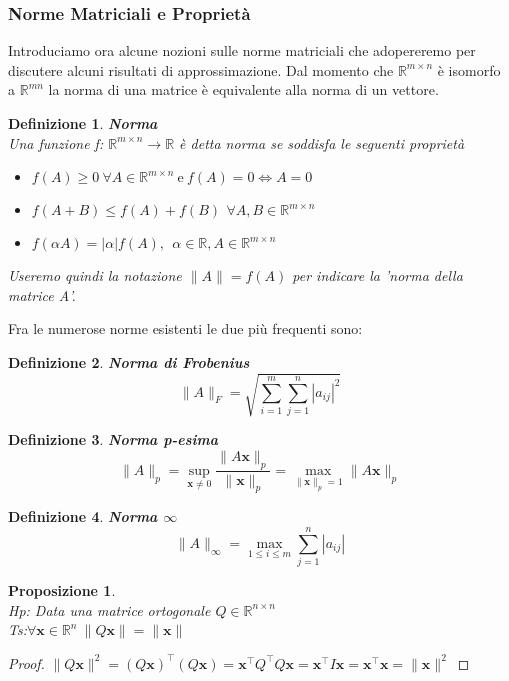 \documentclass[11pt]{article}
\newtheorem{proposition}{Proposizione}
\newtheorem{definition}{Definizione}
\newcommand{\R}{\mathbb{R}} %
\begin{document}
\subsubsection{Norme Matriciali e Proprietà}
Introduciamo ora alcune nozioni sulle norme matriciali che adopereremo per discutere alcuni risultati di approssimazione.
Dal momento che $\R^{m \times n}$ è isomorfo a $\R^{mn}$ la norma di una matrice è equivalente alla norma di un vettore. 
\begin{definition}
	\textbf{Norma}\\ Una funzione f: $\R^{m \times n} \rightarrow \R$ è detta norma se soddisfa le seguenti proprietà
	\begin{itemize}
		\item $f(A) \geq 0 \ \forall A\in \R^{m \times n} \ \text{e} \  f(A)=0 \iff A=0 $
		\item $f(A+B)\leq f(A)+f(B)\  \, \forall A,B \in \R^{m \times n}$ 
		\item $f(\alpha A)=|\alpha|f(A), \ \ \alpha \in \R, A \in \R^{m \times n}$
	\end{itemize}
Useremo quindi la notazione $\|A\|=f(A)$ per indicare la 'norma della matrice A'. 
\end{definition}
\noindent 
Fra le numerose norme esistenti le due più frequenti sono:
\begin{definition}
\textbf{Norma di Frobenius}\\
$$\|A\|_F=\sqrt{\sum_{i=1}^m\sum_{j=1}^n|a_{ij}|^2}$$
\end{definition}
\begin{definition}
\textbf{Norma p-esima}\\
$$ \|A\|_p = \sup_{\mathbf{x} \neq 0} \frac{\|A\mathbf{x}\|_p}{\|\mathbf{x}\|_p}=\max_{\|\mathbf{x}\|_p =1} \|A\mathbf{x}\|_p
$$
\end{definition}
\begin{definition}
\textbf{Norma $\infty$}\\
$$\|A\|_\infty = \max_{1 \leq i \leq m} \sum_{j=1}^{n} |a_{ij}|$$
\end{definition}
\begin{proposition}\label{cons norm}
\textbf{}\\
\textit{Hp:} Data una matrice ortogonale $Q \in \R^{n \times n}$\\
\textit{Ts:$\forall \mathbf{x}\in \R^n \ \|Q\mathbf{x}\|=\|\mathbf{x}\|$} 
\end{proposition}
\begin{proof} $\|Q\mathbf{x}\|^2 = (Q \mathbf{x})^\top      (Q \mathbf{x}) = \mathbf{x}^\top       Q^\top       Q \mathbf{x} = \mathbf{x}^\top      I\mathbf{x} = \mathbf{x}^\top      \mathbf{x} = \|\mathbf{x}\|^2$
\end{proof}
\end{document}
